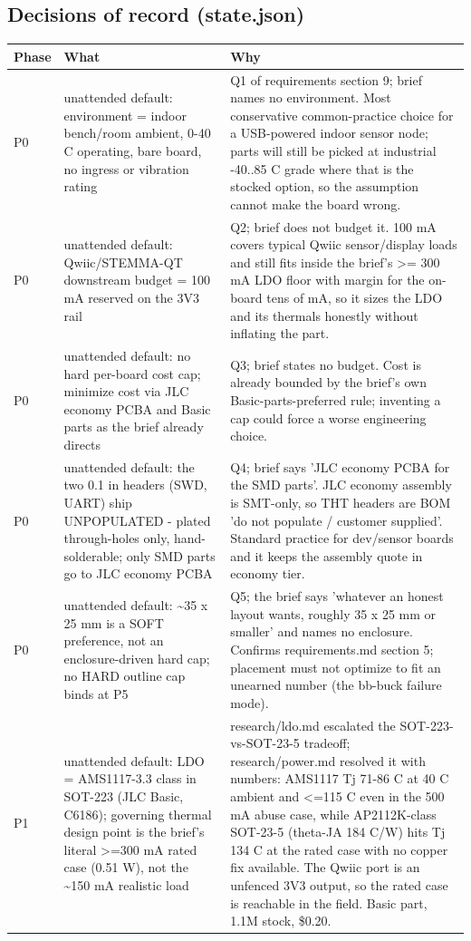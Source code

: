\documentclass[11pt,a4paper]{article}
\begin{document}
\subsection*{Decisions of record (state.json)}
{\small
\begin{longtable}{lp{5.2cm}p{7.2cm}}
\toprule
\textbf{Phase} & \textbf{What} & \textbf{Why} \\
\midrule
\endhead
P0 & unattended default: environment = indoor bench/room ambient, 0-40 C operating, bare board, no ingress or vibration rating & Q1 of requirements section 9; brief names no environment. Most conservative common-practice choice for a USB-powered indoor sensor node; parts will still be picked at industrial -40..85 C grade where that is the stocked option, so the assumption cannot make the board wrong. \\
P0 & unattended default: Qwiic/STEMMA-QT downstream budget = 100 mA reserved on the 3V3 rail & Q2; brief does not budget it. 100 mA covers typical Qwiic sensor/display loads and still fits inside the brief's \textgreater{}= 300 mA LDO floor with margin for the on-board tens of mA, so it sizes the LDO and its thermals honestly without inflating the part. \\
P0 & unattended default: no hard per-board cost cap; minimize cost via JLC economy PCBA and Basic parts as the brief already directs & Q3; brief states no budget. Cost is already bounded by the brief's own Basic-parts-preferred rule; inventing a cap could force a worse engineering choice. \\
P0 & unattended default: the two 0.1 in headers (SWD, UART) ship UNPOPULATED - plated through-holes only, hand-solderable; only SMD parts go to JLC economy PCBA & Q4; brief says 'JLC economy PCBA for the SMD parts'. JLC economy assembly is SMT-only, so THT headers are BOM 'do not populate / customer supplied'. Standard practice for dev/sensor boards and it keeps the assembly quote in economy tier. \\
P0 & unattended default: \textasciitilde{}35 x 25 mm is a SOFT preference, not an enclosure-driven hard cap; no HARD outline cap binds at P5 & Q5; the brief says 'whatever an honest layout wants, roughly 35 x 25 mm or smaller' and names no enclosure. Confirms requirements.md section 5; placement must not optimize to fit an unearned number (the bb-buck failure mode). \\
P1 & unattended default: LDO = AMS1117-3.3 class in SOT-223 (JLC Basic, C6186); governing thermal design point is the brief's literal \textgreater{}=300 mA rated case (0.51 W), not the \textasciitilde{}150 mA realistic load & research/ldo.md escalated the SOT-223-vs-SOT-23-5 tradeoff; research/power.md resolved it with numbers: AMS1117 Tj 71-86 C at 40 C ambient and \textless{}=115 C even in the 500 mA abuse case, while AP2112K-class SOT-23-5 (theta-JA 184 C/W) hits Tj 134 C at the rated case with no copper fix available. The Qwiic port is an unfenced 3V3 output, so the rated case is reachable in the field. Basic part, 1.1M stock, \$0.20. \\

\end{longtable}}
\end{document}
